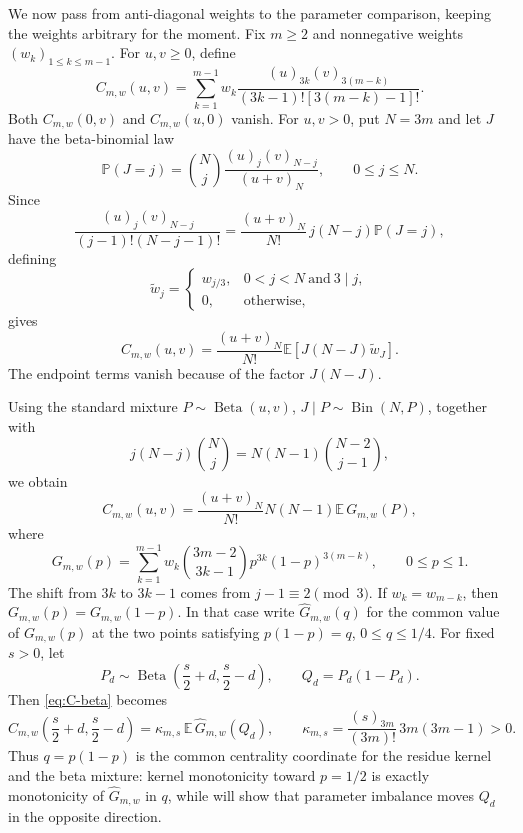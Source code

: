 \documentclass[11pt,a4paper]{amsart}
\numberwithin{equation}{section}
\theoremstyle{plain}
\theoremstyle{definition}
\newcommand{\E}{\mathbb E}
\newcommand{\Pp}{\mathbb P}
\begin{document}
We now pass from anti-diagonal weights to the parameter comparison, keeping the
weights arbitrary for the moment.  Fix \(m\ge2\) and nonnegative weights
\((w_k)_{1\le k\le m-1}\).  For \(u,v\ge0\), define
\begin{equation}\label{eq:C-def}
 C_{m,w}(u,v)
 =\sum_{k=1}^{m-1}w_k
 \frac{(u)_{3k}(v)_{3(m-k)}}{(3k-1)![3(m-k)-1]!}.
\end{equation}
Both \(C_{m,w}(0,v)\) and \(C_{m,w}(u,0)\) vanish.  For \(u,v>0\), put
\(N=3m\) and let \(J\) have the beta-binomial law
\[
 \Pp(J=j)=\binom Nj\frac{(u)_j(v)_{N-j}}{(u+v)_N},
 \qquad 0\le j\le N.
\]
Since
\[
 \frac{(u)_j(v)_{N-j}}{(j-1)!(N-j-1)!}
 =\frac{(u+v)_N}{N!}\,j(N-j)\Pp(J=j),
\]
defining
\[
 \widetilde w_j=
 \begin{cases}
  w_{j/3},&0<j<N\ \text{and}\ 3\mid j,\\
  0,&\text{otherwise},
 \end{cases}
\]
gives
\begin{equation}\label{eq:C-beta-binomial}
 C_{m,w}(u,v)
 =\frac{(u+v)_N}{N!}\E\!\left[J(N-J)\widetilde w_J\right].
\end{equation}
The endpoint terms vanish because of the factor \(J(N-J)\).

Using the standard mixture \(P\sim\operatorname{Beta}(u,v)\),
\(J\mid P\sim\operatorname{Bin}(N,P)\), together with
\[
 j(N-j)\binom Nj=N(N-1)\binom{N-2}{j-1},
\]
we obtain
\begin{equation}\label{eq:C-beta}
 C_{m,w}(u,v)
 =\frac{(u+v)_N}{N!}N(N-1)\E\,G_{m,w}(P),
\end{equation}
where
\begin{equation}\label{eq:G-weighted}
 G_{m,w}(p)
 =\sum_{k=1}^{m-1}w_k\binom{3m-2}{3k-1}
 p^{3k}(1-p)^{3(m-k)},
 \qquad 0\le p\le1.
\end{equation}
The shift from \(3k\) to \(3k-1\) comes from
\(j-1\equiv2\pmod3\).  If \(w_k=w_{m-k}\), then
\(G_{m,w}(p)=G_{m,w}(1-p)\).  In that case write
\(\widehat G_{m,w}(q)\) for the common value of \(G_{m,w}(p)\) at the two points
satisfying \(p(1-p)=q\), \(0\le q\le1/4\).  For fixed \(s>0\), let
\[
 P_d\sim\operatorname{Beta}\left(\frac s2+d,\frac s2-d\right),
 \qquad Q_d=P_d(1-P_d).
\]
Then \eqref{eq:C-beta} becomes
\begin{equation}\label{eq:fixed-sum}
 C_{m,w}\left(\frac s2+d,\frac s2-d\right)
 =\kappa_{m,s}\,\E\,\widehat G_{m,w}(Q_d),
 \qquad
 \kappa_{m,s}=\frac{(s)_{3m}}{(3m)!}\,3m(3m-1)>0.
\end{equation}
Thus \(q=p(1-p)\) is the common centrality coordinate for the residue kernel and
the beta mixture: kernel monotonicity toward \(p=1/2\) is exactly monotonicity
of \(\widehat G_{m,w}\) in \(q\), while  will show that
parameter imbalance moves \(Q_d\) in the opposite direction.
\end{document}
